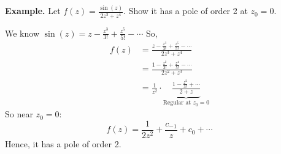 \medskip
\noindent\textbf{Example.} Let $f(z) = \frac{\sin(z)}{2z^3 + z^4}$. Show it has a pole of order 2 at $z_0 = 0$.

We know $\sin(z) = z - \frac{z^3}{3!} + \frac{z^5}{5!} - \cdots$ So,
\begin{align*}
    f(z) &= \frac{z - \frac{z^3}{3!} + \frac{z^5}{5!} - \cdots}{2z^3 + z^4} \\
    &= \frac{1 - \frac{z^2}{3!} + \frac{z^4}{5!} - \cdots}{2z^2 + z^3} \\
    &= \frac{1}{z^2} \cdot \underbrace{\frac{1 - \frac{z^2}{3!} + \cdots}{2+z}}_{\text{Regular at } z_0 = 0}
\end{align*}
So near $z_0 = 0$:
\[
    f(z) = \frac{1}{2z^2} + \frac{c_{-1}}{z} + c_0 + \cdots
\]
Hence, it has a pole of order 2.